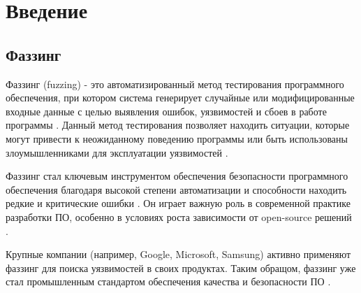 \section{Введение}
\subsection{Фаззинг}
Фаззинг (fuzzing) - это автоматизированный метод тестирования программного обеспечения, при котором система генерирует случайные или модифицированные входные данные с целью выявления ошибок, уязвимостей и сбоев в работе программы \cite{Kuliamin}. Данный метод тестирования позволяет находить ситуации, которые могут привести к неожиданному поведению программы или быть использованы злоумышленниками для эксплуатации уязвимостей \cite{Manes}.

Фаззинг стал ключевым инструментом обеспечения безопасности программного обеспечения благодаря высокой степени автоматизации и способности находить редкие и критические ошибки \cite{Manes}. Он играет важную роль в современной практике разработки ПО, особенно в условиях роста зависимости от open-source решений \cite{Boehme}.

Крупные компании (например, Google, Microsoft, Samsung) активно применяют фаззинг для поиска уязвимостей в своих продуктах. Таким обращом, фаззинг уже стал промышленным стандартом обеспечения качества и безопасности ПО \cite{Boehme}.

